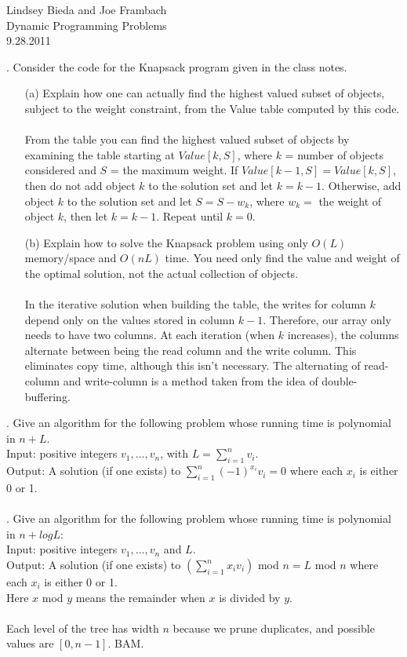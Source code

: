 \documentclass[10pt]{article}
\begin{document}
	\begin{flushright}
	Lindsey Bieda and Joe Frambach\\
	Dynamic Programming Problems\\
	9.28.2011
	\end{flushright}
	. 	Consider the code for the Knapsack program given in the class notes.
	\begin{enumerate}
	\item[(a)]	Explain how one can actually find the highest valued subset of objects, subject to the weight
							constraint, from the Value table computed by this code.\\
							\\
							From the table you can find the highest valued subset of objects by examining the table starting
							at $Value[k,S]$, where $k$ = number of objects considered and $S$ = the maximum weight. If
							$Value[k-1,S] = Value[k,S]$, then do not add object $k$ to the solution set and let $k = k - 1$. 
							Otherwise, add object $k$ to the solution set and let $S=S-w_k$, where $w_k = $
							the weight of object $k$, then let $k=k-1$. Repeat until $k=0$.
	\item[(b)]	Explain how to solve the Knapsack problem using only $O(L)$ memory/space and $O(nL)$ time. You
							need only find the value and weight of the optimal solution, not the actual collection of objects.\\
							\\
							In the iterative solution when building the table, the writes for column $k$ depend only on the values
							stored in column $k-1$. Therefore, our array only needs to have two columns. At each iteration (when $k$ increases),
							the columns alternate between being the read column and the write column. This eliminates copy time, although
							this isn't necessary. The alternating of read-column and write-column is a method taken from the idea of
							double-buffering.
	\end{enumerate}
	
	.	Give an algorithm for the following problem whose running time is polynomial in $n + L$.\\
			Input: positive integers $v_1, \ldots, v_n$, with $L = \sum_{i=1}^n v_i$.\\
			Output: A solution (if one exists) to $\sum_{i=1}^n (-1)^{x_i} v_i = 0$ where each $x_i$ is either 0 or 1.\\
			\\
	.	Give an algorithm for the following problem whose running time is polynomial in $n + log L$:\\
			Input: positive integers $v_1, \ldots , v_n$ and $L$.\\
			Output:  A solution (if one exists) to $(\sum_{i=1}^n x_i v_i)$ mod $n = L$ mod $n$ where each $x_i$ is either 0 or 1.\\
			Here $x$ mod $y$ means the remainder when $x$ is divided by $y$.\\
	\\
	Each level of the tree has width $n$ because we prune duplicates, and possible values are $[0,n-1]$. BAM.\\
\end{document}
